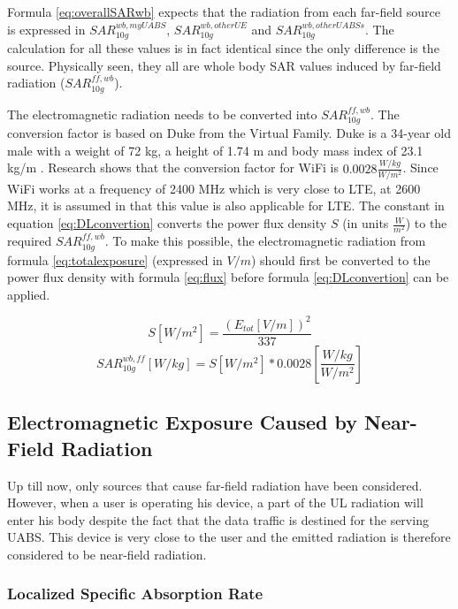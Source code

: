 Formula \ref{eq:overallSARwb} expects that the radiation from each far-field source is expressed in $SAR^{wb,myUABS}_{10g}$, $SAR^{wb,otherUE}_{10g}$ and $SAR^{wb,otherUABSs}_{10g}$. The 
calculation for all these values is in fact identical since the only difference is the source.
Physically seen, they all are whole body SAR values induced by far-field radiation ($SAR^{ff,wb}_{10g}$).

The electromagnetic radiation needs to be converted into $SAR^{ff,wb}_{10g}$. 
The conversion factor is based on Duke from the Virtual Family. Duke is a 34-year old male with a weight of 72 kg, a height of 1.74 m and body
mass index of 23.1 kg/m \cite{J22_plets2015joint}. Research shows that the conversion factor for WiFi is $0.0028 \frac{W/kg}{W/m^2}$.
 Since WiFi works at a frequency of 2400 MHz which 
is very close to LTE, at 2600 MHz, it is assumed in \cite{J22_plets2015joint} that this value is also applicable for \gls{LTE}.
The constant in equation \ref{eq:DLconvertion} converts the \gls{power flux density} $S$ (in units $\frac{W}{m^2}$) to the required $SAR^{ff,wb}_{10g}$.
To make this possible, the electromagnetic radiation
from formula \ref{eq:totalexposure} (expressed in  $V/m$) should first be converted to the  \gls{power flux density} with formula 
\ref{eq:flux} before formula \ref{eq:DLconvertion} can be applied.

\begin{equation}
S [W/m^2]= \frac{(E_{tot} [V/m])^2}{337}
\label{eq:flux}
\end{equation}
\begin{equation}
SAR^{wb,ff}_{10g} [W/kg]= S [W/m^2]* 0.0028  \left[\frac{W/kg}{W/m^2}\right]
\label{eq:DLconvertion}
\end{equation}

\subsection{Electromagnetic Exposure Caused by Near-Field Radiation}
\label{sub:Uplinkexposure}

Up till now, only sources that cause far-field radiation have been considered.
However, when a user is operating his device, a part of the \gls{UL} radiation will enter his body despite the fact 
that the  data traffic is destined for the serving \gls{UABS}. This device is very close to the user and the emitted 
radiation is therefore considered to be near-field radiation.

\subsubsection{Localized Specific Absorption Rate}

